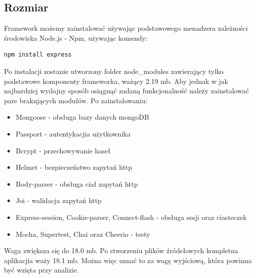 \documentclass[12pt]{report}
\begin{document}
    \subsection{Rozmiar}
      Framework możemy zainstalować używając podstawowego menadzera zależności środowiska Node.js - Npm, używając komendy:
      \begin{lstlisting}[language=bash,numbers=none]
        npm install express
      \end{lstlisting}
      Po instalacji zostanie utworzony folder node\_modules zawierający tylko podstawowe komponenty frameworka, ważący 2.19 mb.
      Aby jednak w jak najbardziej wydajny sposób osiągnąć zadaną funkcjonalność należy zainstalować pare brakujących modułów.
      Po zainstalowaniu:
      \begin{itemize}
        \item Mongoose - obsługa bazy danych mongoDB
        \item Passport - autentykacjia użytkownika
        \item Bcrypt - przechowywanie haseł
        \item Helmet - bezpieczeństwo zapytań http
        \item Body-parser - obsługa ciał zapytań http
        \item Joi - walidacja zapytań http
        \item Express-session, Cookie-parser, Connect-flash - obsługa sesji oraz ciasteczek
        \item Mocha, Supertest, Chai oraz Cheerio - testy 
      \end{itemize} 
      Waga zwiększa się do 18.0 mb.
      Po stworzeniu plików źródełowych kompletna aplikacjia waży 18.1 mb.
      Można więc uznać to za wagę wyjściową, która powinna być wzięta przy analizie.
\end{document}
